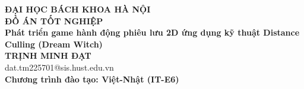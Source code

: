 \documentclass[DoAn.tex]{subfiles}
\begin{document}
\begin{titlepage}
\thispagestyle{empty}

\begin{center}

{\textbf{\large{ĐẠI HỌC BÁCH KHOA HÀ NỘI}}}\\[4cm]

{\textbf{\huge{ĐỒ ÁN TỐT NGHIỆP}}}\\[1cm]
{\textbf{\Large{Phát triển game hành động phiêu lưu 2D ứng dụng kỹ thuật Distance Culling (Dream Witch)}}}\\[1cm]

{\textbf{\large{TRỊNH MINH ĐẠT}}}\\
{\large{dat.tm225701@sis.hust.edu.vn}}\\[0.5cm]

{\textbf{\large{Chương trình đào tạo: Việt-Nhật (IT-E6)}}}\\

\vspace{2cm}

\begin{table}[H]
\centering
{}
\end{table}
\end{center}

\end{titlepage}
\end{document}
